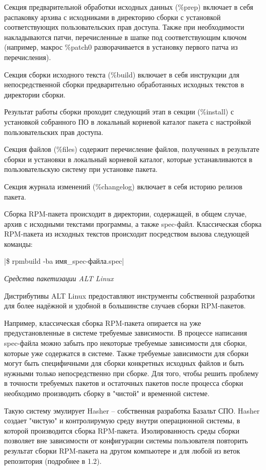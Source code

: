 \documentclass[bachelor, och, pract]{SCWorks}
\begin{document}
Секция предварительной обработки исходных данных (\%prep) включает в себя распаковку архива с исходниками в директорию сборки с установкой соответствующих пользовательских прав доступа.
Также при необходимости накладываются патчи, перечисленные в шапке под соответствующим ключом (например, макрос \%patch0 разворачивается в установку первого патча из перечисления).

Секция сборки исходного текста (\%build) включает в себя инструкции для непосредственной сборки предварительно обработанных исходных текстов в директории сборки.

Результат работы сборки проходит следующий этап в секции (\%install) с установкой собранного ПО в локальный корневой каталог пакета с настройкой пользовательских прав доступа.

Секция файлов (\%files) содержит перечисление файлов, полученных в результате сборки и установки в локальный корневой каталог, которые устанавливаются в пользовательскую систему при установке пакета.

Секция журнала изменений (\%changelog) включает в себя историю релизов пакета.

Сборка RPM-пакета происходит в директории, содержащей, в общем случае, архив с исходными текстами программы, а также spec-файл.
Классическая сборка RPM-пакета из исходных текстов происходит посредством вызова следующей команды:

|\$ rpmbuild -ba имя_spec-файла.spec| %

\textit{Средства пакетизации ALT Linux}

Дистрибутивы ALT Linux предоставляют инструменты собственной разработки для более надёжной и удобной в большинстве случаев сборки RPM-пакетов.

Например, классическая сборка RPM-пакета опирается на уже предустановленные в системе требуемые зависимости.
В процессе написания spec-файла можно забыть про некоторые требуемые зависимости для сборки, которые уже содержатся в системе.
Также требуемые зависимости для сборки могут быть специфичными для сборки конкретных исходных файлов и быть нужными только непосредственно при сборке.
Для того, чтобы решить проблему в точности требуемых пакетов и остаточных пакетов после процесса сборки необходимо производить сборку в "чистой" и временной системе.

Такую систему эмулирует Hasher -- собственная разработка Базальт СПО.
Hasher создает "чистую" и контролирумую среду внутри операционной системы, в которой производится сборка RPM-пакета.
Изолированность среды сборки позволяет вне зависимости от конфигурации системы пользователя повторить результат сборки RPM-пакета на другом компьютере и для любой из веток репозитория (подробнее в 1.2).
\end{document}
